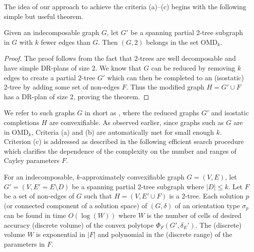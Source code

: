 The idea of our approach to achieve the criteria (a)--(c) begins with the following simple but useful theorem.

\begin{theorem}
\label{theorem:omdk}
    Given an indecomposable graph $G$, let $G'$ be a spanning partial 2-tree subgraph in $G$ with $k$ fewer edges than $G$. Then $(G,2)$ belongs in the set OMD$_k$.
\end{theorem}

\begin{proof}
    The proof follows from the fact that 2-trees are well decomposable and have simple DR-plans of size 2. We know that $G$ can be reduced by removing $k$ edges to create a partial 2-tree $G'$ which can then be completed to an (isostatic) 2-tree by adding some set of non-edges $F$. Thus the modified graph $H = G'\cup F$ has  a DR-plan of size 2, proving the theorem.
\end{proof}


We refer to such graphs $G$ in short as , where the reduced graphs $G'$ and isostatic completions $H$ are convexifiable. As observed earlier, since graphs such as $G$ are in OMD$_k$, Criteria (a) and (b) are automatically met for small enough $k$. Criterion (c) is addressed as described in the following efficient search procedure which clarifies the dependence of the complexity on the number and ranges  of Cayley parameters $F$.

\begin{theorem*}
\label{theorem:criterionc}
    For an indecomposable, $k$-approximately convexifiable graph $G = (V,E)$, let $G' = (V,E' =E\setminus D)$ be a spanning partial 2-tree subgraph where $|D| \le  k$. Let  $F$ be a set of non-edges of $G$ such that $H = (V, E'\cup F)$ is a 2-tree. Each solution $p$ (or connected component of a solution space) of $(G,\delta)$ of an orientation type $\sigma_p$ can be found in time $O(\log(W))$ where $W$ is the number of cells of desired accuracy (discrete volume) of the convex polytope $\Phi_F(G',\delta_E')$. The (discrete) volume $W$ is exponential in $|F|$ and polynomial in the (discrete range) of the parameters in $F$.
\end{theorem*}


